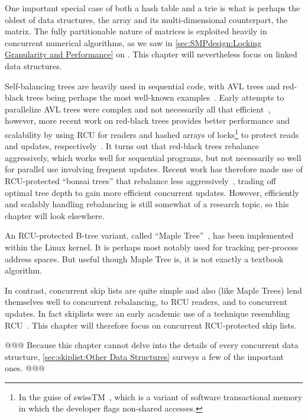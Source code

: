 One important special case of both a hash table and a trie is what is
perhaps the oldest of data structures, the array and its multi-dimensional
counterpart, the matrix.
The fully partitionable nature of matrices is exploited heavily in
concurrent numerical algorithms, as we saw in
\cref{sec:SMPdesign:Locking Granularity and Performance}
on
.
This chapter will nevertheless focus on linked data structures.

Self-balancing trees are heavily used in sequential code, with
AVL trees and red-black trees being perhaps the most well-known
examples~\cite{ThomasHCorman2001Algorithms}.
Early attempts to parallelize AVL trees were complex and not necessarily
all that efficient~\cite{Ellis80},
however, more recent work on red-black trees provides better
performance and scalability by using RCU for readers and hashed arrays
of locks\footnote{
	In the guise of swissTM~\cite{AleksandarDragovejic2011STMnotToy},
	which is a variant of software transactional memory in which
	the developer flags non-shared accesses.}
to protect reads and updates,
respectively~\cite{PhilHoward2011RCUTMRBTree,PhilipWHoward2013RCUrbtree}.
It turns out that red-black trees rebalance aggressively, which works
well for sequential programs, but not necessarily so well for parallel
use involving frequent updates.
Recent work has therefore made use of RCU-protected ``bonsai trees''
that rebalance less aggressively~\cite{AustinClements2012RCULinux:mmapsem},
trading off optimal tree depth to gain more efficient concurrent updates.
However, efficiently and scalably handling rebalancing is still somewhat
of a research topic, so this chapter will look elsewhere.

An RCU-protected B-tree variant, called
``Maple Tree''~\cite{LiamHowlett2022MapleTree,MatthewWilcox2022MapleTree},
has been implemented within the Linux kernel.
It is perhaps most notably used for tracking per-process address spaces.
But useful though Maple Tree is, it is not exactly a textbook algorithm.

In contrast, concurrent skip lists are quite simple and also (like Maple
Trees) lend themselves well to concurrent rebalancing, to RCU readers,
and to concurrent updates.
In fact skiplists were an early academic use of a technique resembling
RCU~\cite{Pugh90}.
This chapter will therefore focus on concurrent RCU-protected skip lists.

@@@
Because this chapter cannot delve into the details of every concurrent
data structure,
\cref{sec:skiplist:Other Data Structures}
surveys a few of the important ones.
@@@
